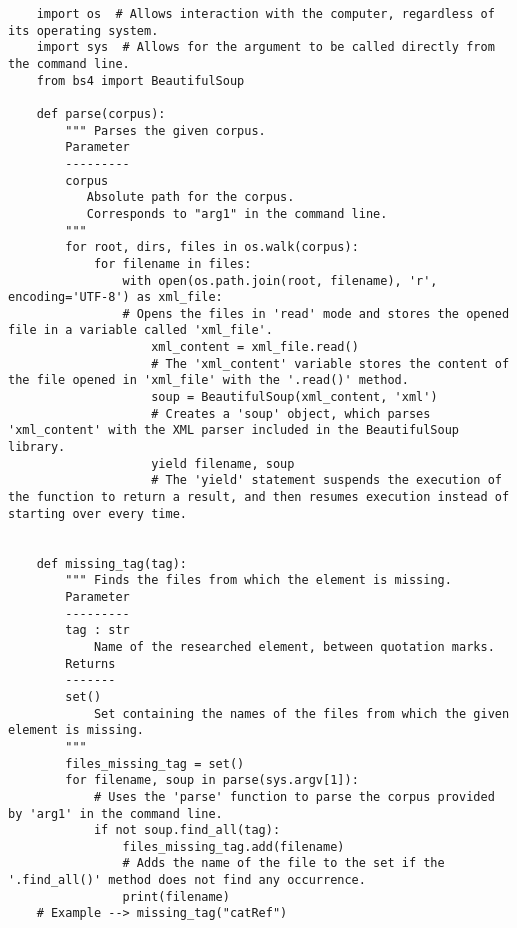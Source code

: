 
\label{Script}

\begin{verbatim}    
    import os  # Allows interaction with the computer, regardless of its operating system.
    import sys  # Allows for the argument to be called directly from the command line.
    from bs4 import BeautifulSoup
  
    def parse(corpus):
        """ Parses the given corpus.
        Parameter
        ---------
        corpus
           Absolute path for the corpus.
           Corresponds to "arg1" in the command line.
        """
        for root, dirs, files in os.walk(corpus):
            for filename in files:
                with open(os.path.join(root, filename), 'r', encoding='UTF-8') as xml_file:
                # Opens the files in 'read' mode and stores the opened file in a variable called 'xml_file'.
                    xml_content = xml_file.read()
                    # The 'xml_content' variable stores the content of the file opened in 'xml_file' with the '.read()' method.
                    soup = BeautifulSoup(xml_content, 'xml')
                    # Creates a 'soup' object, which parses 'xml_content' with the XML parser included in the BeautifulSoup library.
                    yield filename, soup
                    # The 'yield' statement suspends the execution of the function to return a result, and then resumes execution instead of starting over every time.

   
    def missing_tag(tag):
        """ Finds the files from which the element is missing.
        Parameter
        ---------
        tag : str
            Name of the researched element, between quotation marks.    
        Returns
        -------
        set()
            Set containing the names of the files from which the given element is missing.
        """
        files_missing_tag = set()
        for filename, soup in parse(sys.argv[1]):
            # Uses the 'parse' function to parse the corpus provided by 'arg1' in the command line.
            if not soup.find_all(tag):
                files_missing_tag.add(filename)
                # Adds the name of the file to the set if the '.find_all()' method does not find any occurrence.
                print(filename)
    # Example --> missing_tag("catRef")
\end{verbatim}